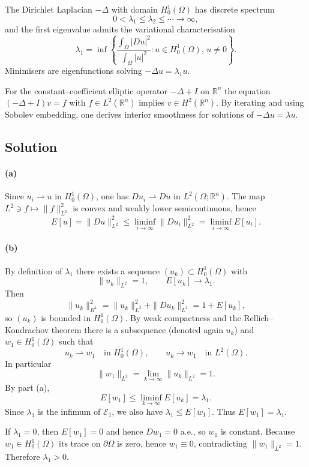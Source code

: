 \documentclass[12pt,a4paper]{article}
\theoremstyle{plain}
\theoremstyle{definition}
\theoremstyle{remark}
\theoremstyle{remark}
\begin{document}
The Dirichlet Laplacian $-\Delta$ with domain $H_0^1(\Omega)$ has discrete
spectrum
\[
0<\lambda_1\le\lambda_2\le\cdots\to\infty,
\]
and the first eigenvalue admits the variational characterisation
\[
\lambda_1 = \inf\left\{
\frac{\int_\Omega |Du|^2}{\int_\Omega |u|^2}
: u\in H_0^1(\Omega),\,u\neq 0\right\}.
\]
Minimisers are eigenfunctions solving $-\Delta u=\lambda_1 u$.

For the constant–coefficient elliptic operator $-\Delta+I$ on $\mathbb{R}^n$
the equation $(-\Delta+I)v=f$ with $f\in L^2(\mathbb{R}^n)$ implies
$v\in H^2(\mathbb{R}^n)$. By iterating and using Sobolev embedding, one
derives interior smoothness for solutions of $-\Delta u = \lambda u$.

\subsection*{Solution}

\paragraph{(a)} Since $u_i\rightharpoonup u$ in $H_0^1(\Omega)$, one has
$Du_i\rightharpoonup Du$ in $L^2(\Omega;\mathbb{R}^n)$. The map
$L^2\ni f\mapsto\|f\|_{L^2}^2$ is convex and weakly lower semicontinuous,
hence
\[
E[u]=\|Du\|_{L^2}^2\le
\liminf_{i\to\infty}\|Du_i\|_{L^2}^2
=\liminf_{i\to\infty}E[u_i].
\]

\paragraph{(b)} By definition of $\lambda_1$ there exists a sequence
$(u_k)\subset H_0^1(\Omega)$ with
\[
\|u_k\|_{L^2}=1,\qquad E[u_k]\to\lambda_1.
\]
Then
\[
\|u_k\|_{H^1}^2=\|u_k\|_{L^2}^2+\|Du_k\|_{L^2}^2
=1+E[u_k],
\]
so $(u_k)$ is bounded in $H_0^1(\Omega)$. By weak compactness and the
Rellich--Kondrachov theorem there is a subsequence (denoted again $u_k$)
and $w_1\in H_0^1(\Omega)$ such that
\[
u_k\rightharpoonup w_1\quad\text{in }H_0^1(\Omega),\qquad
u_k\to w_1\quad\text{in }L^2(\Omega).
\]
In particular
\[
\|w_1\|_{L^2}=\lim_{k\to\infty}\|u_k\|_{L^2}=1.
\]
By part (a),
\[
E[w_1]\le\liminf_{k\to\infty}E[u_k]=\lambda_1.
\]
Since $\lambda_1$ is the infimum of $\mathcal{E}_1$, we also have
$\lambda_1\le E[w_1]$. Thus $E[w_1]=\lambda_1$.

If $\lambda_1=0$, then $E[w_1]=0$ and hence $Dw_1=0$ a.e., so $w_1$ is
constant. Because $w_1\in H_0^1(\Omega)$ its trace on $\partial\Omega$ is
zero, hence $w_1\equiv 0$, contradicting $\|w_1\|_{L^2}=1$. Therefore
$\lambda_1>0$.
\end{document}
